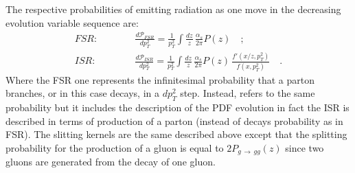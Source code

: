 The respective probabilities of emitting radiation as one move in the decreasing evolution variable sequence are:
\begin{align}
	FSR: \qquad\quad & \frac{d\mathcal{P}_{FSR}}{dp_T^2} = \frac{1}{p_T^2}\displaystyle\int \frac{dz}{z}\,\frac{\alpha_s}{2\pi}P(z)\quad ;\label{eq:FSR1}\\
	ISR: \qquad\quad & \frac{d\mathcal{P}_{ISR}}{dp_T^2} = \frac{1}{p_T^2}\displaystyle\int \frac{dz}{z}\,\frac{\alpha_s}{2\pi}P(z)\,\frac{f'(x/z,p_T^2)}{f(x,p_T^2)}\quad .\label{eq:ISR1}
\end{align}
Where the FSR one represents the infinitesimal probability that a parton branches, or in this case decays, in a $dp_T^2$ step.
Instead,  refers to the same probability but it includes the description of the PDF evolution in fact the ISR is described in terms of production of a parton (instead of decays probability as in FSR). The slitting kernels are the same described above except that the splitting probability for the  production of a gluon is equal to $2P_{g\,\rightarrow\,gg}(z)$ since two gluons are generated from the decay of one gluon.

